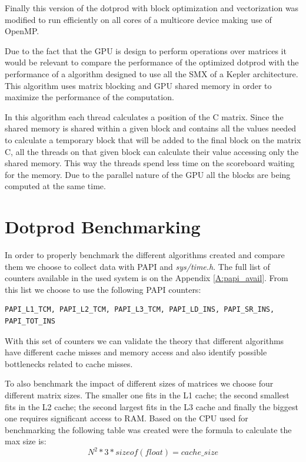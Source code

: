 \documentclass[a4paper]{report}
\begin{document}
Finally this version of the dotprod with block optimization and vectorization
was modified to run efficiently on all cores of a multicore device making use of
OpenMP.

Due to the fact that the GPU is design to perform operations over matrices it
would be relevant to compare the performance of the optimized dotprod with the
performance of a algorithm designed to use all the SMX of a Kepler architecture.
This algorithm uses matrix blocking and GPU shared memory in order to maximize
the performance of the computation.

In this algorithm each thread calculates a position of the C matrix. Since the
shared memory is shared within a given block and contains all the values needed
to calculate a temporary block that will be added to the final block on the
matrix C, all the threads on that given block can calculate their value
accessing only the shared memory. This way the threads spend less time on the
scoreboard waiting for the memory. Due to the parallel nature of the GPU all the
blocks are being computed at the same time.

\chapter{Dotprod Benchmarking}
In order to properly benchmark the different algorithms created and compare them
we choose to collect data with PAPI and \textit{sys/time.h}. The full list of
counters available in the used system is on the Appendix \ref{A:papi_avail}. From
this list we choose to use the following PAPI counters:
\begin{verbatim}
PAPI_L1_TCM, PAPI_L2_TCM, PAPI_L3_TCM, PAPI_LD_INS, PAPI_SR_INS, PAPI_TOT_INS
\end{verbatim}

With this set of counters we can validate the theory that different algorithms
have different cache misses and memory access and also identify possible
bottlenecks related to cache misses.

To also benchmark the impact of different sizes of matrices we choose four
different matrix sizes. The smaller one fits in the L1 cache; the second
smallest fits in the L2 cache; the second largest fits in the L3 cache and
finally the biggest one requires significant access to RAM. Based on the CPU
used for benchmarking the following table was created were the formula to
calculate the max size is: \[N^2*3*sizeof(float) = cache\_size\]
\end{document}
